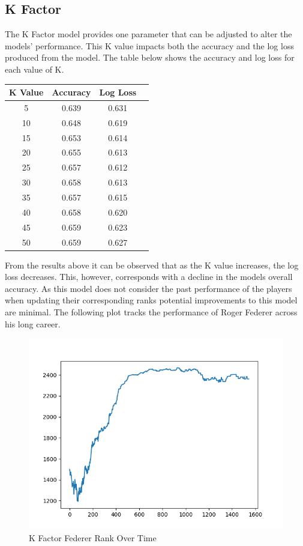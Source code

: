\documentclass[12pt,a4paper]{article}
\begin{document}
\subsection{K Factor}
The K Factor model provides one parameter that can be adjusted to alter the models' performance.
This K value impacts both the accuracy and the log loss produced from the model. The table
below shows the accuracy and log loss for each value of K.

\begin{center}
  \begin{tabular}{||c c c c||}
    \hline
    K Value & Accuracy & Log Loss \\
    \hline\hline
    5       & 0.639    & 0.631    \\
    10      & 0.648    & 0.619    \\
    15      & 0.653    & 0.614    \\
    20      & 0.655    & 0.613    \\
    25      & 0.657    & 0.612    \\
    30      & 0.658    & 0.613    \\
    35      & 0.657    & 0.615    \\
    40      & 0.658    & 0.620    \\
    45      & 0.659    & 0.623    \\
    50      & 0.659    & 0.627    \\
    \hline
  \end{tabular}
\end{center}
From the results above it can be observed that as the K value increases, the log loss decreases.
This, however, corresponds with a decline in the models overall accuracy. As this model
does not consider the past performance of the players when updating their corresponding
ranks potential improvements to this model are minimal. The following plot tracks the performance
of Roger Federer across his long career.

\begin{figure}[H]
  \centering
  \includegraphics[scale=0.8]{images/federer_k_factor.png}
  \caption{K Factor Federer Rank Over Time}
  \label{fig:federer-kfactor}
\end{figure}
\end{document}
